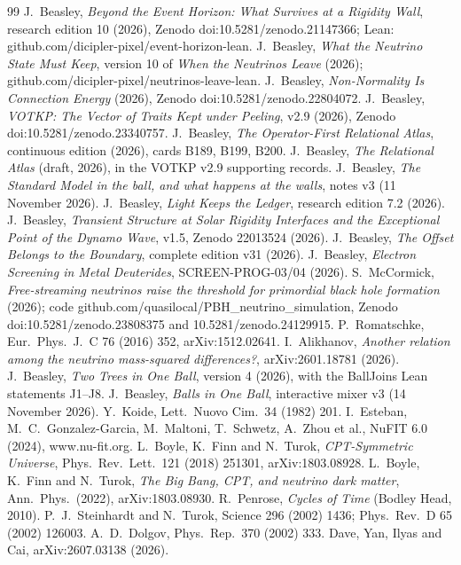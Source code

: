 \documentclass[11pt]{article}
\theoremstyle{definition}\newtheorem{hypothesis}{Hypothesis}\newtheorem{prediction}{Prediction}
\theoremstyle{remark}\newtheorem{remark}[theorem]{Remark}
\begin{document}
\begin{thebibliography}{99}\small
{} J.~Beasley, \emph{Beyond the Event Horizon: What Survives at a Rigidity Wall}, research edition 10 (2026), Zenodo doi:10.5281/zenodo.21147366; Lean: github.com/dicipler-pixel/event-horizon-lean.
 J.~Beasley, \emph{What the Neutrino State Must Keep}, version 10 of \emph{When the Neutrinos Leave} (2026); github.com/dicipler-pixel/neutrinos-leave-lean.
 J.~Beasley, \emph{Non-Normality Is Connection Energy} (2026), Zenodo doi:10.5281/zenodo.22804072.
 J.~Beasley, \emph{VOTKP: The Vector of Traits Kept under Peeling}, v2.9 (2026), Zenodo doi:10.5281/zenodo.23340757.
 J.~Beasley, \emph{The Operator-First Relational Atlas}, continuous edition (2026), cards B189, B199, B200.
 J.~Beasley, \emph{The Relational Atlas} (draft, 2026), in the VOTKP v2.9 supporting records.
 J.~Beasley, \emph{The Standard Model in the ball, and what happens at the walls}, notes v3 (11 November 2026).
 J.~Beasley, \emph{Light Keeps the Ledger}, research edition 7.2 (2026).
 J.~Beasley, \emph{Transient Structure at Solar Rigidity Interfaces and the Exceptional Point of the Dynamo Wave}, v1.5, Zenodo 22013524 (2026).
 J.~Beasley, \emph{The Offset Belongs to the Boundary}, complete edition v31 (2026).
 J.~Beasley, \emph{Electron Screening in Metal Deuterides}, SCREEN-PROG-03/04 (2026).
 S.~McCormick, \emph{Free-streaming neutrinos raise the threshold for primordial black hole formation} (2026); code github.com/quasilocal/PBH\_neutrino\_simulation, Zenodo doi:10.5281/zenodo.23808375 and 10.5281/zenodo.24129915.
 P.~Romatschke, Eur.\ Phys.\ J.\ C 76 (2016) 352, arXiv:1512.02641.
 I.~Alikhanov, \emph{Another relation among the neutrino mass-squared differences?}, arXiv:2601.18781 (2026).
 J.~Beasley, \emph{Two Trees in One Ball}, version 4 (2026), with the BallJoins Lean statements J1--J8.
 J.~Beasley, \emph{Balls in One Ball}, interactive mixer v3 (14 November 2026).
 Y.~Koide, Lett.\ Nuovo Cim.\ 34 (1982) 201.
 I.~Esteban, M.~C.~Gonzalez-Garcia, M.~Maltoni, T.~Schwetz, A.~Zhou et al., NuFIT 6.0 (2024), www.nu-fit.org.
 L.~Boyle, K.~Finn and N.~Turok, \emph{CPT-Symmetric Universe}, Phys.\ Rev.\ Lett.\ 121 (2018) 251301, arXiv:1803.08928.
 L.~Boyle, K.~Finn and N.~Turok, \emph{The Big Bang, CPT, and neutrino dark matter}, Ann.\ Phys.\ (2022), arXiv:1803.08930.
 R.~Penrose, \emph{Cycles of Time} (Bodley Head, 2010).
 P.~J.~Steinhardt and N.~Turok, Science 296 (2002) 1436; Phys.\ Rev.\ D 65 (2002) 126003.
 A.~D.~Dolgov, Phys.\ Rep.\ 370 (2002) 333.
 Dave, Yan, Ilyas and Cai, arXiv:2607.03138 (2026).
\end{thebibliography}
\end{document}
